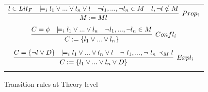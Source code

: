 \documentclass{article}
\begin{document}
	\begin{figure}[t]
	\centering
	\begin{framed}
	\begin{tabular}{c}
		$\infer[Prop_i]{M := Ml}{l \in Lit_F 
			 & \models_i l_1 \lor 
			... \lor l_n \lor l & \neg l_1, 
			..., \neg l_n \in M & l,\neg l 
			\notin M}$ \\ \\
		$\infer[Confl_i]{C := \{l_1 \lor ... 
			\lor l_n \}}{C = \phi & \models_i 
			l_1 \lor ... \lor l_n & \neg l_1, 
			..., \neg l_n \in M}$ \\ \\
		$\infer[Expl_i]{C := \{l_1 \lor ... 
			\lor l_n \lor D\}}{C = \{\neg l 
			\lor D\} & \models_i l_1 \lor ... 
			\lor l_n \lor l & \neg\ l_1, ..., 
			\neg\ l_n \prec_M l}$ \\ \\
	\end{tabular}
	\end{framed}
	\caption{Transition rules at Theory level}
		\label{fig:theoryrules}
	\end{figure}
\end{document}
